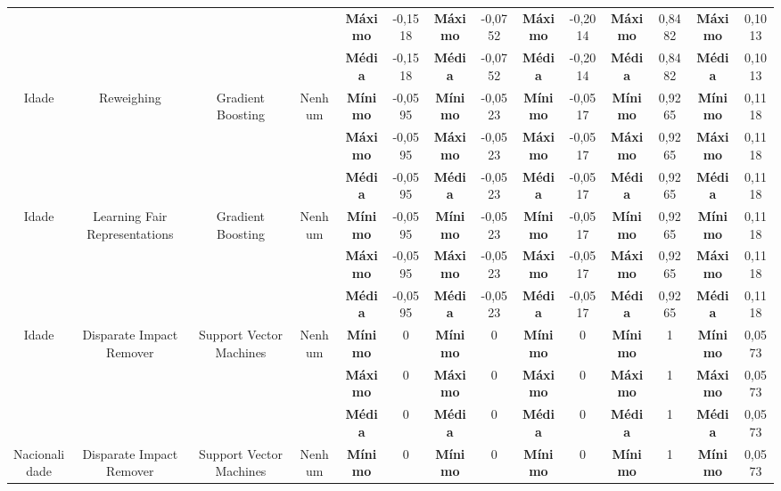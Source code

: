 \documentclass[portugues]{ic-tese}
\begin{document}
\begin{table}[H]
\begin{center}
{\begin{tabular}{c|c|c|c|c|c|c|c|c|c|c|c|c|c}
             & & & & \textbf{Máximo} & -0,1518 & \textbf{Máximo} & -0,0752 & \textbf{Máximo} & -0,2014 & \textbf{Máximo} & 0,8482 & \textbf{Máximo} & 0,1013 \\
             & & & & \textbf{Média} & -0,1518 & \textbf{Média} & -0,0752 & \textbf{Média} & -0,2014 & \textbf{Média} & 0,8482 & \textbf{Média} & 0,1013 \\
            \hline
            \multirow{3}{*}{Idade} & \multirow{3}{*}{Reweighing} & \multirow{3}{*}{Gradient Boosting} & \multirow{3}{*}{Nenhum} & \textbf{Mínimo} & -0,0595 & \textbf{Mínimo} & -0,0523 & \textbf{Mínimo} & -0,0517 & \textbf{Mínimo} & 0,9265 & \textbf{Mínimo} & 0,1118 \\
             & & & & \textbf{Máximo} & -0,0595 & \textbf{Máximo} & -0,0523 & \textbf{Máximo} & -0,0517 & \textbf{Máximo} & 0,9265 & \textbf{Máximo} & 0,1118 \\
             & & & & \textbf{Média} & -0,0595 & \textbf{Média} & -0,0523 & \textbf{Média} & -0,0517 & \textbf{Média} & 0,9265 & \textbf{Média} & 0,1118 \\
            \hline
            \multirow{3}{*}{Idade} & \multirow{3}{*}{Learning Fair Representations} & \multirow{3}{*}{Gradient Boosting} & \multirow{3}{*}{Nenhum} & \textbf{Mínimo} & -0,0595 & \textbf{Mínimo} & -0,0523 & \textbf{Mínimo} & -0,0517 & \textbf{Mínimo} & 0,9265 & \textbf{Mínimo} & 0,1118 \\
             & & & & \textbf{Máximo} & -0,0595 & \textbf{Máximo} & -0,0523 & \textbf{Máximo} & -0,0517 & \textbf{Máximo} & 0,9265 & \textbf{Máximo} & 0,1118 \\
             & & & & \textbf{Média} & -0,0595 & \textbf{Média} & -0,0523 & \textbf{Média} & -0,0517 & \textbf{Média} & 0,9265 & \textbf{Média} & 0,1118 \\
            \hline
            \multirow{3}{*}{Idade} & \multirow{3}{*}{Disparate Impact Remover} & \multirow{3}{*}{Support Vector Machines} & \multirow{3}{*}{Nenhum} & \textbf{Mínimo} & 0 & \textbf{Mínimo} & 0 & \textbf{Mínimo} & 0 & \textbf{Mínimo} & 1 & \textbf{Mínimo} & 0,0573 \\
             & & & & \textbf{Máximo} & 0 & \textbf{Máximo} & 0 & \textbf{Máximo} & 0 & \textbf{Máximo} & 1 & \textbf{Máximo} & 0,0573 \\
             & & & & \textbf{Média} & 0 & \textbf{Média} & 0 & \textbf{Média} & 0 & \textbf{Média} & 1 & \textbf{Média} & 0,0573 \\
            \hline
            \multirow{3}{*}{Nacionalidade} & \multirow{3}{*}{Disparate Impact Remover} & \multirow{3}{*}{Support Vector Machines} & \multirow{3}{*}{Nenhum} & \textbf{Mínimo} & 0 & \textbf{Mínimo} & 0 & \textbf{Mínimo} & 0 & \textbf{Mínimo} & 1 & \textbf{Mínimo} & 0,0573 \\

\end{tabular}}
\end{center}
\end{table}
\end{document}
